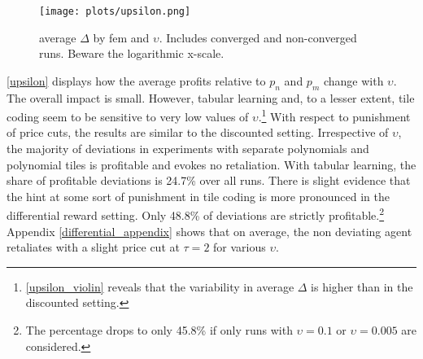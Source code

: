  \begin{figure}
	\texttt{[image: plots/upsilon.png]}
	\caption[average $\Delta$ by \gls{fem} and $\upsilon$]{average $\Delta$ by \gls{fem} and $\upsilon$. Includes converged and non-converged runs. Beware the logarithmic x-scale.}
	\label{upsilon}
\end{figure}


\autoref{upsilon} displays how the average profits relative to $p_n$ and $p_m$ change with $\upsilon$. The overall impact is small. However, tabular learning and, to a lesser extent, tile coding seem to be sensitive to very low values of $\upsilon$.\footnote{\autoref{upsilon_violin} reveals that the variability in average $\Delta$ is higher than in the discounted setting.} With respect to punishment of price cuts, the results are similar to the discounted setting. Irrespective of $\upsilon$, the majority of deviations in experiments with separate polynomials and polynomial tiles is profitable and evokes no retaliation. With tabular learning, the share of profitable deviations is 24.7\% over all runs. There is slight evidence that the hint at some sort of punishment in tile coding is more pronounced in the differential reward setting. Only 48.8\% of deviations are strictly profitable.\footnote{The percentage drops to only 45.8\% if only runs with $\upsilon = 0.1$ or $\upsilon = 0.005$ are considered.} Appendix \ref{differential_appendix} shows that on average, the non deviating agent retaliates with a slight price cut at $\tau = 2$ for various $\upsilon$.


\pagebreak